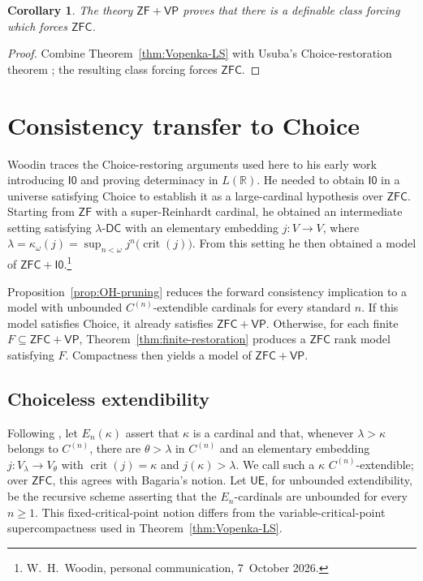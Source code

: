 \documentclass[11pt,a4paper]{amsart}
\newif\ifrevisionblue
\DeclareRobustCommand{\revision}[1]{{\ifrevisionblue\color{blue}\fi#1}}
\newcommand{\VP}{\mathsf{VP}}
\newcommand{\ZF}{\mathsf{ZF}}
\newcommand{\ZFC}{\mathsf{ZFC}}
\newcommand{\DC}{\mathsf{DC}}
\newcommand{\crit}{\operatorname{crit}}
\newcommand{\UE}{\mathsf{UE}}
\newcommand{\Izero}{\mathsf{I0}}
\theoremstyle{plain}
\newtheorem{corollary}[theorem]{Corollary}
\theoremstyle{definition}
\theoremstyle{remark}
\begin{document}
\begin{corollary}\label{cor:class-force-ZFC}
The theory $\ZF+\VP$ proves that there is a definable class forcing which forces $\ZFC$.
\end{corollary}

\begin{proof}
Combine Theorem~\ref{thm:Vopenka-LS} with Usuba's Choice-restoration theorem \cite[Corollary~4.8]{Usuba}; the resulting class forcing forces $\ZFC$.
\end{proof}
\endgroup

\begingroup

\section{Consistency transfer to Choice}\label{sec:consistency-transfer}

\revision{Woodin traces the Choice-restoring arguments used here
to his early work introducing $\Izero$ and proving determinacy in
$L(\mathbb R)$. He needed to obtain $\Izero$ in a universe satisfying
Choice to establish it as a large-cardinal hypothesis over $\ZFC$.
Starting from $\ZF$ with a super-Reinhardt cardinal, he obtained
an intermediate setting
satisfying $\lambda$-$\DC$ with an elementary embedding $j:V\to V$,
where $\lambda=\kappa_\omega(j)
=\sup_{n<\omega}j^n\bigl(\crit(j)\bigr)$.
From this setting he then obtained a model of
$\ZFC+\Izero$.\footnote{%
\revision{W.~H.~Woodin, personal communication, 7~October 2026.}}}

Proposition~\ref{prop:OH-pruning} reduces the forward consistency implication to a model with unbounded $C^{(n)}$-extendible cardinals for every standard $n$.  If this model satisfies Choice, it already satisfies $\ZFC+\VP$.  Otherwise, for each finite $F\subseteq\ZFC+\VP$, Theorem~\ref{thm:finite-restoration} produces a $\ZFC$ rank model satisfying $F$.  Compactness then yields a model of $\ZFC+\VP$.

\subsection*{{Choiceless extendibility}}

Following \cite[Definition~6.6]{Mohammd}, let $E_n(\kappa)$ assert that $\kappa$ is a cardinal and that, whenever $\lambda>\kappa$ belongs to $C^{(n)}$, there are $\theta>\lambda$ in $C^{(n)}$ and an elementary embedding $j:V_\lambda\to V_\theta$ with $\crit(j)=\kappa$ and $j(\kappa)>\lambda$.  We call such a $\kappa$ $C^{(n)}$-extendible; over $\ZFC$, this agrees with Bagaria's notion.  Let $\UE$, for unbounded extendibility, be the recursive scheme asserting that the $E_n$-cardinals are unbounded for every $n\geq1$.
This fixed-critical-point notion differs from the variable-critical-point supercompactness used in Theorem~\ref{thm:Vopenka-LS}.
\end{document}
